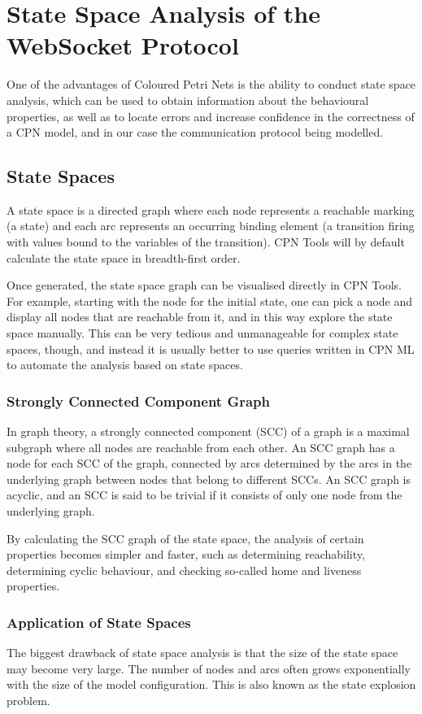 \chapter{State Space Analysis of the WebSocket Protocol}
\label{chap:statespace}

One of the advantages of Coloured Petri Nets is the ability to conduct state
space analysis, which can be used to obtain information about the
behavioural properties, as well as to locate errors
and increase confidence in the correctness of a CPN model, and in our case the
communication protocol being modelled.

\section{State Spaces}
A state space is a directed graph where each node represents a reachable marking
(a state) and each arc represents an occurring binding element (a transition
firing with values bound to the variables of the transition). CPN Tools will
by default calculate the state space in breadth-first order. 

Once generated, the state space graph can be visualised directly in CPN Tools.
For example, starting with the node for the initial state, one can pick a node
and display all nodes that are reachable from it, and in this way explore the state space
manually. This can be very tedious and unmanageable for complex state spaces,
though, and instead it is usually better to use queries written in CPN ML to
automate the analysis based on state spaces.

	\subsection{Strongly Connected Component Graph}
	In graph theory, a strongly connected component (SCC) of a graph is a maximal
	subgraph where all nodes are reachable from each other. An SCC graph has a node
	for each SCC of the graph, connected by arcs determined by the arcs in the
	underlying graph between nodes that belong to different SCCs. An
	SCC graph is acyclic, and an SCC is said to be trivial if it consists of only
	one node from the underlying graph.
	
	By calculating the SCC graph of the state space, the analysis of certain
	properties becomes simpler and faster, such as determining reachability,
	determining cyclic behaviour, and checking so-called home and liveness
	properties.

	\subsection{Application of State Spaces}
		The biggest drawback of state space analysis is that the size of the state
		space may become very large. The number of nodes and arcs often grows exponentially
		with the size of the model configuration.
		This is also known as the state explosion problem.
		
